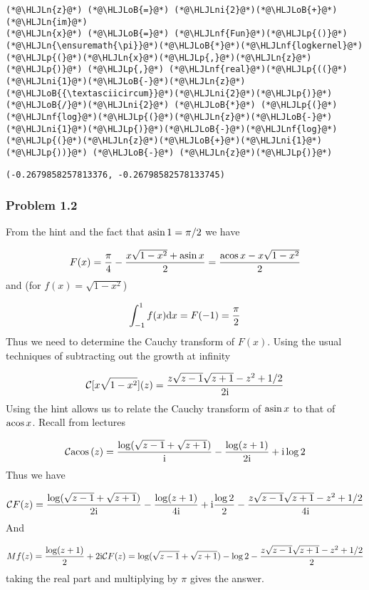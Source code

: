 \documentclass[12pt,landscape]{article}
\newcommand{\HLJLn}[1]{#1}
\newcommand{\HLJLnf}[1]{\textcolor[RGB]{66,102,213}{#1}}
\newcommand{\HLJLni}[1]{\textcolor[RGB]{59,151,46}{#1}}
\newcommand{\HLJLoB}[1]{\textcolor[RGB]{102,102,102}{\textbf{#1}}}
\newcommand{\HLJLp}[1]{#1}
\def\D{ {\rm d} }
\def\I{ {\rm i} }
\def\CC{ {\cal C} }
\def\acos{ {\rm acos}\, }
\def\asin{ {\rm asin}\, }
\begin{document}
{\begin{lstlisting}
(*@\HLJLn{z}@*) (*@\HLJLoB{=}@*) (*@\HLJLni{2}@*)(*@\HLJLoB{+}@*)(*@\HLJLn{im}@*)
(*@\HLJLn{x}@*) (*@\HLJLoB{=}@*) (*@\HLJLnf{Fun}@*)(*@\HLJLp{()}@*)
(*@\HLJLn{\ensuremath{\pi}}@*)(*@\HLJLoB{*}@*)(*@\HLJLnf{logkernel}@*)(*@\HLJLp{(}@*)(*@\HLJLn{x}@*)(*@\HLJLp{,}@*)(*@\HLJLn{z}@*)(*@\HLJLp{)}@*) (*@\HLJLp{,}@*) (*@\HLJLnf{real}@*)(*@\HLJLp{((}@*)(*@\HLJLni{1}@*)(*@\HLJLoB{-}@*)(*@\HLJLn{z}@*)(*@\HLJLoB{{\textasciicircum}}@*)(*@\HLJLni{2}@*)(*@\HLJLp{)}@*)(*@\HLJLoB{/}@*)(*@\HLJLni{2}@*) (*@\HLJLoB{*}@*) (*@\HLJLp{(}@*)(*@\HLJLnf{log}@*)(*@\HLJLp{(}@*)(*@\HLJLn{z}@*)(*@\HLJLoB{-}@*)(*@\HLJLni{1}@*)(*@\HLJLp{)}@*)(*@\HLJLoB{-}@*)(*@\HLJLnf{log}@*)(*@\HLJLp{(}@*)(*@\HLJLn{z}@*)(*@\HLJLoB{+}@*)(*@\HLJLni{1}@*)(*@\HLJLp{))}@*) (*@\HLJLoB{-}@*) (*@\HLJLn{z}@*)(*@\HLJLp{)}@*)
\end{lstlisting}

\begin{lstlisting}
(-0.2679858257813376, -0.26798582578133745)
\end{lstlisting}


\subsubsection{Problem 1.2}
From the hint and the fact that $\asin 1 = \pi/2$ we have

\[
F(x) = {\pi \over 4}- {x \sqrt{1-x^2} + \asin x \over 2} =
    {\acos x - x \sqrt{1-x^2} \over 2}
\]
and  (for $f(x) = \sqrt{1-x^2}$)

\[
\int_{-1}^1 f(x) \D x = F(-1) = {\pi \over 2}
\]
Thus we need to determine the Cauchy transform of $F(x)$. Using the usual techniques of subtracting out the growth at infinity

\[
\CC[x \sqrt{1-x^2}](z) = {z  \sqrt{z-1} \sqrt{z+1} - z^2 +1/2 \over 2 \I}
\]
Using the hint allows us to relate the Cauchy transform of $\asin x$ to that of $\acos x$. Recall from lectures

\[
\CC \acos(z) = {\log(\sqrt{z-1} + \sqrt{z+1}) \over \I} - {\log(z+1) \over 2 \I} + \I \log 2
\]
Thus we have

\[
\CC F(z) = {\log(\sqrt{z-1} + \sqrt{z+1}) \over 2\I} - {\log(z+1) \over 4 \I} + \I {\log 2 \over 2}
  - {z  \sqrt{z-1} \sqrt{z+1} - z^2 +1/2 \over 4 \I}
\]
And

\[
M f(z) = {\log(z+1) \over 2} + 2 \I \CC F(z) = \log(\sqrt{z-1} + \sqrt{z+1})- \log 2 - {z  \sqrt{z-1} \sqrt{z+1} - z^2 +1/2 \over 2}
\]
taking the real part and multiplying by \ensuremath{\pi} gives the answer.

}
\end{document}
